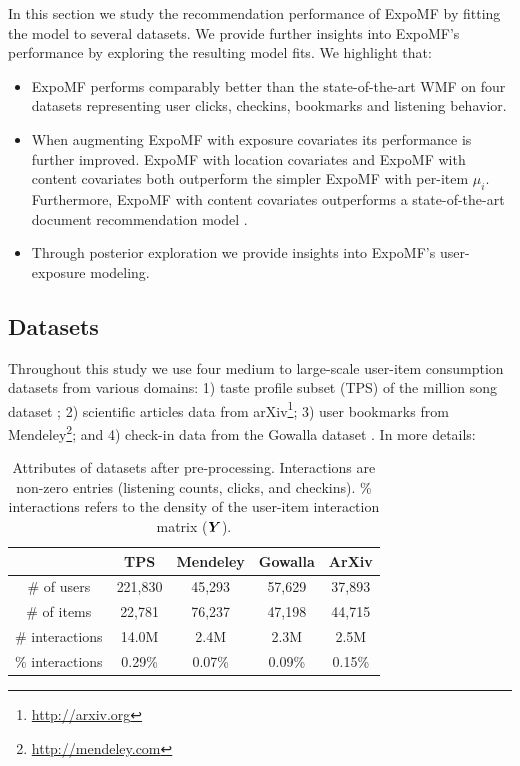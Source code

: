In this section we study the recommendation performance of ExpoMF by fitting
the model to several datasets. We provide further insights into ExpoMF's
performance by exploring the resulting model fits. We highlight that: 
\begin{itemize} 
\item ExpoMF performs comparably better than the state-of-the-art WMF
\cite{hu2008collaborative} on four datasets representing user clicks, checkins,
bookmarks and listening behavior.
\item When augmenting ExpoMF with exposure covariates its performance is
further improved. ExpoMF with location covariates and ExpoMF with content
covariates both outperform the simpler ExpoMF with per-item $\mu_i$.
Furthermore, ExpoMF with content covariates outperforms a state-of-the-art
document recommendation model \cite{wang2011collaborative}.  
\item Through posterior exploration we provide insights into ExpoMF's user-exposure modeling.
\end{itemize} 

\subsection{Datasets}
Throughout this study we use four medium to large-scale user-item consumption datasets from various domains: 
1) taste profile subset (TPS) of the million song dataset \cite{bertin2011million}; 2) scientific articles data from
arXiv\footnote{\url{http://arxiv.org}}; 3) user bookmarks from Mendeley\footnote{\url{http://mendeley.com}}; and 4) check-in
data from the Gowalla dataset \cite{cho2011friendship}. In more details:

\begin{table}
\centering
\begin{tabular}{ c c c c c  }
  \hline
   & \textbf{TPS} & \textbf{Mendeley} & \textbf{Gowalla} & \textbf{ArXiv} \\
   \hline
  \# of users & 221,830 & 45,293 & 57,629 & 37,893   \\
  \# of items & 22,781& 76,237 & 47,198 & 44,715 \\
  \# interactions & 14.0M &  2.4M & 2.3M & 2.5M\\
  $\%$ interactions & 0.29\% & 0.07\% & 0.09\% & 0.15\%\\
  \hline 
\end{tabular}
\caption{Attributes of datasets after pre-processing. Interactions are non-zero
entries (listening counts, clicks, and checkins). \% interactions refers to the
density of the user-item interaction matrix ($\boldsymbol{Y}$).}
\label{tab:data}
\end{table}

